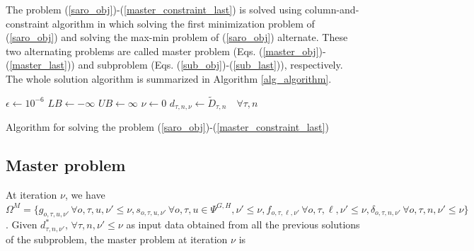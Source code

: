 \documentclass[final]{IEEEtran}
\begin{document}
The problem (\ref{saro_obj})-(\ref{master_constraint_last}) is solved using column-and-constraint algorithm in which solving the first minimization problem of (\ref{saro_obj}) and solving the max-min problem of (\ref{saro_obj}) alternate. These two alternating problems are called master problem (Eqs. (\ref{master_obj})-(\ref{master_last})) and subproblem (Eqs. (\ref{sub_obj})-(\ref{sub_last})), respectively. The whole solution algorithm is summarized in Algorithm \ref{alg_algorithm}.

\begin{algorithm}
\SetAlgoLined
\DontPrintSemicolon
$\epsilon \leftarrow 10^{-6}$ \;
$LB \leftarrow -\infty$ \;
$UB \leftarrow \infty$ \;
$\nu \leftarrow 0$ \;
$d_{\tau, n, \nu} \leftarrow \tilde{D}_{\tau, n} \quad \forall \tau, n$ \;
\caption{Algorithm for solving the problem (\ref{saro_obj})-(\ref{master_constraint_last})}
\label{alg_algorithm}
\end{algorithm}

\subsection{Master problem}

At iteration $\nu$, we have $\Omega^{M} = \{ g_{o, \tau, u, \nu'} \, \forall o, \tau, u, \nu' \leq \nu, s_{o, \tau, u, \nu'} \, \forall o, \tau, u \in \Psi^{G, H}, \nu' \leq \nu, f_{o, \tau, \ell, \nu'} \, \forall o, \tau, \ell, \nu' \leq \nu, \delta_{o, \tau, n, \nu'} \, \forall o, \tau, n, \nu' \leq \nu \}$. Given $d_{\tau, n, \nu'}^*, \, \forall \tau, n, \nu' \leq \nu$ as input data obtained from all the previous solutions of the subproblem, the master problem at iteration $\nu$ is
\end{document}
